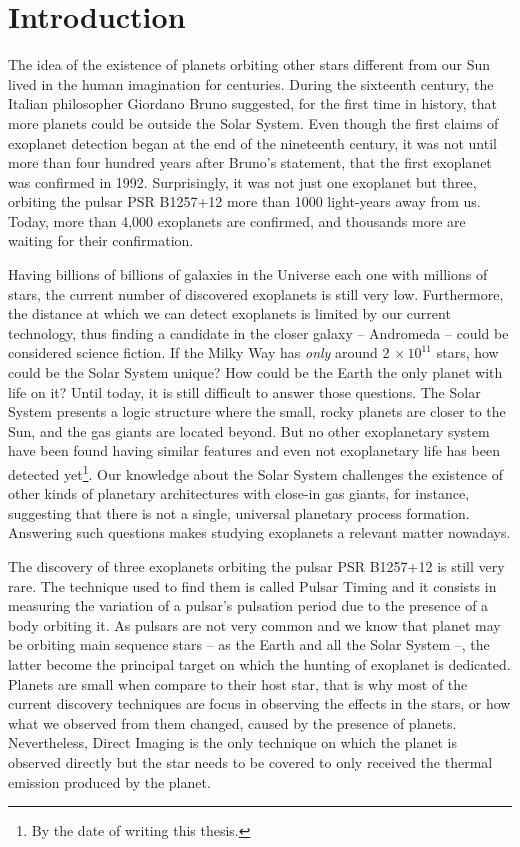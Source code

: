 \chapter{Introduction}\label{chap:intro}
The idea of the existence of planets orbiting other stars different from our Sun lived in the human imagination for centuries. During the sixteenth century, the Italian philosopher Giordano Bruno suggested, for the first time in history, that more planets could be outside the Solar System. Even though the first claims of exoplanet detection began at the end of the nineteenth century, it was not until more than four hundred years after Bruno's statement, that the first exoplanet was confirmed in 1992. Surprisingly, it was not just one exoplanet but three, orbiting the pulsar PSR B1257+12 more than 1000 light-years away from us. Today, more than 4,000 exoplanets are confirmed, and thousands more are waiting for their confirmation.


Having billions of billions of galaxies in the Universe each one with millions of stars, the current number of discovered exoplanets is still very low. Furthermore, the distance at which we can detect exoplanets is limited by our current technology, thus finding a candidate in the closer galaxy -- Andromeda -- could be considered science fiction. If the Milky Way has \textit{only} around $2\,\times10^{11}$ stars, how could be the Solar System unique? How could be the Earth the only planet with life on it? Until today, it is still difficult to answer those questions. The Solar System presents a logic structure where the small, rocky planets are closer to the Sun, and the gas giants are located beyond. But no other exoplanetary system have been found having similar features and even not exoplanetary life has been detected yet\footnote{By the date of writing this thesis.}. Our knowledge about the Solar System challenges the existence of other kinds of planetary architectures with close-in gas giants, for instance, suggesting that there is not a single, universal planetary process formation. Answering such questions makes studying exoplanets a relevant matter nowadays.

The discovery of three exoplanets orbiting the pulsar PSR B1257+12 is still very rare. The technique used to find them is called Pulsar Timing and it consists in measuring the variation of a pulsar's pulsation period due to the presence of a body orbiting it. As pulsars are not very common and we know that planet may be orbiting main sequence stars -- as the Earth and all the Solar System --, the latter become the principal target on which the hunting of exoplanet is dedicated. Planets are small when compare to their host star, that is why most of the current discovery techniques are focus in observing the effects in the stars, or how what we observed from them changed, caused by the presence of planets. Nevertheless, Direct Imaging is the only technique on which the planet is observed directly but the star needs to be covered to only received the thermal emission produced by the planet.  

